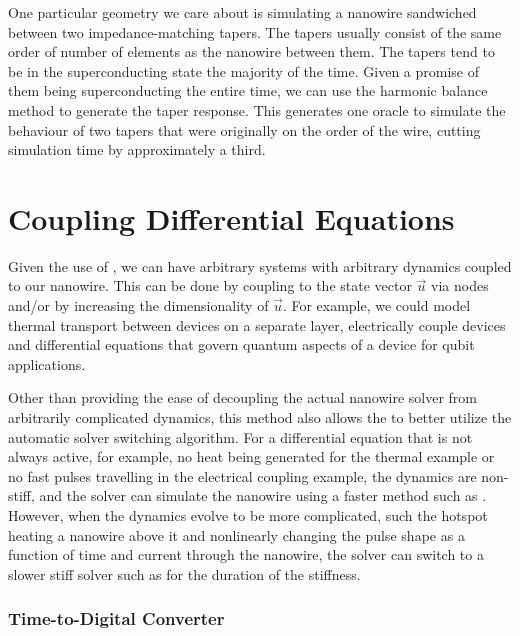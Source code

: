 One particular geometry we care about is simulating a nanowire sandwiched between two impedance-matching tapers.
The tapers usually consist of the same order of number of elements as the nanowire between them. The tapers
tend to be in the superconducting state the majority of the time. Given a promise of them being superconducting
the entire time, we can use the harmonic balance method to generate the taper response. This generates one oracle
to simulate the behaviour of two tapers that were originally on the order of the wire, cutting simulation time by
approximately a third.

\section{Coupling Differential Equations}

Given the use of , we can have arbitrary systems with arbitrary dynamics
coupled to our nanowire. This can be done by coupling to the state vector $\vec u$ via nodes and/or
by increasing the dimensionality of $\vec u$. For example, we could model thermal transport between
devices on a separate layer, electrically couple devices and differential
equations that govern quantum aspects of a device for qubit applications.

Other than providing the ease of decoupling the actual nanowire solver from arbitrarily complicated
dynamics, this method also allows the  to better utilize the automatic solver
switching algorithm. For a differential equation that is not always active, for example, no heat being generated for the thermal example or no fast pulses travelling in the electrical coupling example,
the dynamics are non-stiff, and the solver can simulate the nanowire using a faster method such as
. However, when the dynamics evolve to be more complicated, such the hotspot heating a nanowire
above it and nonlinearly changing the pulse shape as a function of time and current through the nanowire,
the solver can switch to a slower stiff solver such as  for the duration of the stiffness.

\subsubsection{Time-to-Digital Converter}

